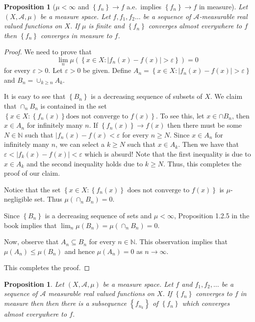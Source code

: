 \documentclass[12pt]{article}
\newtheorem{proposition}[theorem]{Proposition}
\theoremstyle{definition}
\theoremstyle{remark}
\theoremstyle{plain}
\newcommand{\N}{\mathbb N}
\newcommand{\scrA}{{\mathscr A}}
\begin{document}
\begin{proposition}[$\mu<\infty$ and $\left\{ f_n \right\}\to f$ a.e.\ implies $\left\{ f_n \right\}\to f$ in measure]
    Let $(X, \scrA, \mu )$ be a measure space. Let $f, f_1, f_2 \ldots $ be a sequence of $\scrA$-measurable real valued functions on $X$. If $\mu$ is finite and $\left\{ f_n \right\}$ converges almost everywhere to $f$ then $\left\{ f_n \right\}$ converges in measure to $f$.
\end{proposition}
\begin{proof}
   We need to prove that
   $$\lim_n \mu \left( \left\{ x\in X : |f_n (x) -f(x)| > \varepsilon \right\} \right) = 0$$
   for every $\varepsilon > 0$. Let $\varepsilon > 0 $ be given. Define $A_n=\left\{ x\in X : |f_n (x) -f(x)| > \varepsilon \right\}$ and $B_n = \cup _{k\ge n} A_k$.

   It is easy to see that $\left\{ B_n \right\}$ is a decreasing sequence of subsets of $X$. We claim that $\cap_{n} B_n$ is contained in the set $\left\{ x\in X : \left\{ f_n \left( x \right) \right\} \text{does not converge to } f\left( x \right) \right\}$. To see this, let $x\in \cap B_n$, then $x\in A_n$ for infinitely many $n$. If $\left\{ f_n (x) \right\} \to f \left( x \right)$ then there must be some $N\in\N$ such that $|f_n \left( x \right) - f\left( x \right)< \varepsilon$ for every $n\ge N$. Since $x\in A_n$ for infinitely many $n$, we can select a $k\ge N$ such that $x\in A_k$. Then we have that $\varepsilon < |f_k (x) -f(x)| < \varepsilon$ which is absurd! Note that the first inequality is due to $x\in A_k$ and the second inequality holds due to $k \ge N$. Thus, this completes the proof of our claim.

   Notice that the set $\left\{ x\in X : \left\{ f_n (x) \right\} \text{ does not converge to } f\left( x \right) \right\}$ is $\mu$- negligible set. Thus $\mu \left( \cap _n B_n \right) = 0$.

   Since $\left\{ B_n \right\}$ is a decreasing sequence of sets and $\mu < \infty$, Proposition 1.2.5 in the book implies that $\lim _n \mu \left( B_n \right) = \mu \left( \cap _n B_n \right) = 0$.

   Now, observe that $A_n \subseteq B_n$ for every $n\in \N$. This observation implies that $\mu (A_n) \le \mu \left( B_n \right)$ and hence $\mu \left( A_n \right) = 0$ as $n\to \infty$.
   
   This completes the proof.
\end{proof}

\begin{proposition}
    Let $\left( X, \scrA , \mu \right)$ be a measure space. Let $f$ and $f_1 , f_2, \ldots$ be a sequence of $\scrA$ measurable real valued functions on $X$. If $\left\{ f_n \right\}$ converges to $f$ in measure then then there is a subsequence $\left\{ f_{n_k} \right\}$ of $\left\{ f_n \right\}$ which converges almost everywhere to $f$.
\end{proposition}
\end{document}

